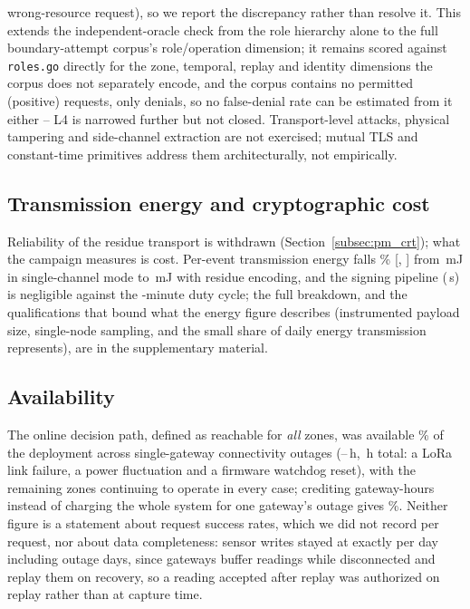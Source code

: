 \documentclass[a4paper,fleqn]{cas-sc}
\begin{document}
wrong-resource request), so we report the discrepancy rather than resolve
it. This extends the independent-oracle check from the role hierarchy
alone to the full boundary-attempt corpus's role/operation dimension; it
remains scored against \texttt{roles.go} directly for the zone, temporal,
replay and identity dimensions the corpus does not separately encode, and
the corpus contains no permitted (positive) requests, only denials, so no
false-denial rate can be estimated from it either -- L4 is narrowed
further but not closed. Transport-level attacks,
physical tampering and side-channel extraction are not exercised; mutual
TLS and constant-time primitives address them architecturally, not
empirically.

\subsection{Transmission energy and cryptographic cost}
\label{subsec:integrity}

Reliability of the residue transport is withdrawn (Section~\ref{subsec:pm_crt});
what the campaign measures is cost. Per-event transmission energy falls
\EnergyReductionPct\% [\EnergyReductionCILow, \EnergyReductionCIHigh] from
\EnergySingle\,mJ in single-channel mode to \EnergyCRT\,mJ with residue
encoding, and the signing pipeline (\SignTotal\,\textmu{}s) is negligible
against the \DutyCycleMinutes-minute duty cycle; the full breakdown, and
the qualifications that bound what the energy figure describes (instrumented
payload size, single-node sampling, and the small share of daily energy
transmission represents), are in the supplementary material.

\subsection{Availability}
\label{subsec:availability}

The online decision path, defined as reachable for \emph{all} zones, was
available \UptimePct\% of the deployment across \OutageCount{}
single-gateway connectivity outages (\OutageHoursMin--\OutageHoursMax\,h,
\OutageHoursTotal\,h total: a LoRa link failure, a power fluctuation and a
firmware watchdog reset), with the remaining zones continuing to operate
in every case; crediting gateway-hours instead of charging the whole
system for one gateway's outage gives \UptimeGatewayHoursPct\%. Neither
figure is a statement about request success rates, which we did not
record per request, nor about data completeness: sensor writes stayed at
exactly \WritesPerDay{} per day including outage days, since gateways
buffer readings while disconnected and replay them on recovery, so a
reading accepted after replay was authorized on replay rather than at
capture time.
\end{document}
